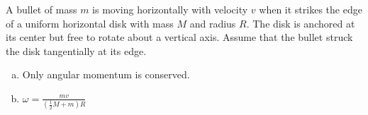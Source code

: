 %
%
\question
A bullet of mass $m$ is moving horizontally with velocity $v$ when it strikes the edge of a uniform horizontal disk with mass $M$ and radius $R$. The disk is anchored at its center but free to rotate about a vertical axis. Assume that the bullet struck the disk tangentially at its edge.
\begin{finalanswer}
\begin{enumerate}[(a)]
\item Only angular momentum is conserved.
\item $\omega =\frac{mv}{\left(\frac{1}{2}M+m\right)R}$
\end{enumerate}
\end{finalanswer}

